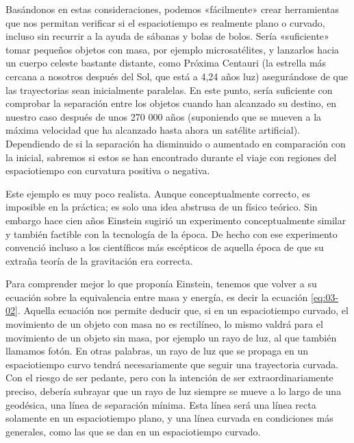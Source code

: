 Basándonos en estas consideraciones, podemos «fácilmente» crear herramientas que nos permitan
verificar si el espaciotiempo es realmente plano o curvado, incluso sin recurrir a la ayuda de
sábanas y bolas de bolos. Sería «suficiente» tomar pequeños objetos con masa, por ejemplo
microsatélites, y lanzarlos hacia un cuerpo celeste bastante distante, como Próxima Centauri
(la estrella más cercana a nosotros después del Sol, que está a 4,24 años luz) asegurándose de
que las trayectorias sean inicialmente paralelas. En este punto, sería suficiente con comprobar
la separación entre los objetos cuando han alcanzado su destino, en nuestro caso después de
unos 270 000 años (suponiendo que se mueven a la máxima velocidad que ha alcanzado hasta ahora
un satélite artificial). Dependiendo de si la separación ha disminuido o aumentado en
comparación con la inicial, sabremos si estos se han encontrado durante el viaje con regiones
del espaciotiempo con curvatura positiva o negativa.

Este ejemplo es muy poco realista. Aunque conceptualmente correcto, es imposible en la
práctica; es solo una idea abstrusa de un físico teórico. Sin embargo hace cien años Einstein
sugirió un experimento conceptualmente similar y también factible con la tecnología de la
época. De hecho con ese experimento convenció incluso a los científicos más escépticos de
aquella época de que su extraña teoría de la gravitación era correcta.

Para comprender mejor lo que proponía Einstein, tenemos que volver a su ecuación sobre la
equivalencia entre masa y energía, es decir la ecuación \eqref{eq:03-02}. Aquella ecuación nos
permite deducir que, si en un espaciotiempo curvado, el movimiento de un objeto con masa no es
rectilíneo, lo mismo valdrá para el movimiento de un objeto sin masa, por ejemplo un rayo de
luz, al que también llamamos fotón. En otras palabras, un rayo de luz que se propaga en un
espaciotiempo curvo tendrá necesariamente que seguir una trayectoria curvada. Con el riesgo de
ser pedante, pero con la intención de ser extraordinariamente preciso, debería subrayar que un
rayo de luz siempre se mueve a lo largo de una geodésica, una línea de separación mínima. Esta
línea será una línea recta solamente en un espaciotiempo plano, y una línea curvada en
condiciones más generales, como las que se dan en un espaciotiempo curvado.

